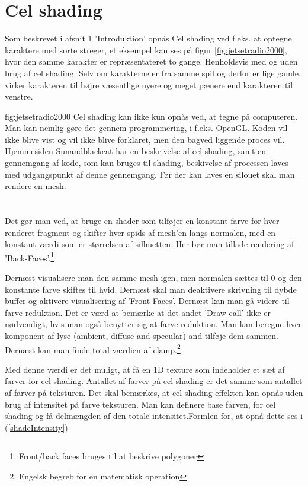 \section{Cel shading}
Som beskrevet i afsnit 1 'Introduktion' opnås Cel shading ved f.eks. at optegne karaktere med sorte streger, et eksempel kan ses på figur \ref{fig:jetsetradio2000}, hvor den samme karakter er repræsentateret to gange. Henholdsvis med og uden brug af cel shading. Selv om karakterne er fra samme spil og derfor er lige gamle, virker karakteren til højre væsentlige nyere og meget pænere end karakteren til venstre. 

 {fig:jetsetradio2000}
Cel shading kan ikke kun opnås ved, at tegne på computeren. Man kan nemlig gøre det gennem programmering, i f.eks. OpenGL. Koden vil ikke blive vist og vil ikke blive forklaret, men den bagved liggende proces vil. Hjemmesiden Sunandblackcat \cite{sunandblackcat2016} har en beskrivelse af cel shading, samt en gennemgang af kode, som kan bruges til shading, beskivelse af processen laves med udgangspunkt af denne gennemgang. Før der kan laves en silouet skal man rendere en mesh.\\\\\\Det gør man ved, at bruge en shader som tilføjer en konstant farve for hver renderet fragment og skifter hver spids af mesh’en langs normalen, med en konstant værdi som er størrelsen af silhuetten. Her bør man tillade rendering af ’Back-Faces’.\footnote[1]{Front/back faces bruges til at beskrive polygoner}

Dernæst visualisere man den samme mesh igen, men normalen sættes til 0 og den konstante farve skiftes til hvid.  Dernæst skal man deaktivere skrivning til dybde buffer og aktivere visualisering af ’Front-Faces’. Dernæst kan man gå videre til farve reduktion. Det er værd at bemærke at det andet ’Draw call’ ikke er nødvendigt, hvis man også benytter sig at farve reduktion. 
Man kan beregne hver komponent af lyse (ambient, diffuse and specular) and tilføje dem sammen. Dernæst kan man finde total værdien af clamp.\footnote[2]{Engelsk begreb for en matematisk operation}

Med denne værdi er det muligt, at få en 1D texture som indeholder et sæt af farver for cel shading. Antallet af farver på cel shading er det samme som antallet af farver på teksturen. Det skal bemærkes, at cel shading effekten kan opnås uden brug af intensitet på farve teksturen. 
Man kan definere base farven, for cel shading og få delmængden af den totale intensitet.Formlen for, at opnå dette ses i (\ref{shadeIntensity})
 
